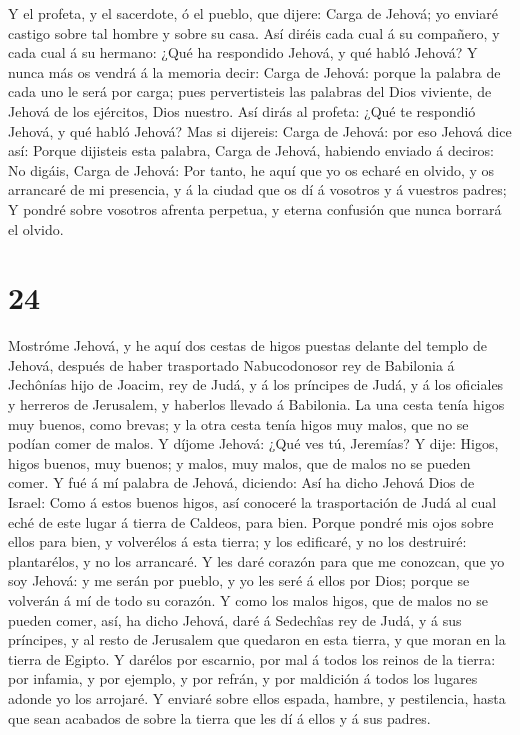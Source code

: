 Y el profeta, y el sacerdote, ó el pueblo, que dijere: Carga de Jehová;
yo enviaré castigo sobre tal hombre y sobre su casa.  Así
diréis cada cual á su compañero, y cada cual á su hermano: ¿Qué ha
respondido Jehová, y qué habló Jehová?  Y nunca más os
vendrá á la memoria decir: Carga de Jehová: porque la palabra de cada
uno le será por carga; pues pervertisteis las palabras del Dios
viviente, de Jehová de los ejércitos, Dios nuestro.  Así
dirás al profeta: ¿Qué te respondió Jehová, y qué habló Jehová?
 Mas si dijereis: Carga de Jehová: por eso Jehová dice así:
Porque dijisteis esta palabra, Carga de Jehová, habiendo enviado á
deciros: No digáis, Carga de Jehová:  Por tanto, he aquí
que yo os echaré en olvido, y os arrancaré de mi presencia, y á la
ciudad que os dí á vosotros y á vuestros padres;  Y pondré
sobre vosotros afrenta perpetua, y eterna confusión que nunca borrará el
olvido.

\hypertarget{section-23}{%
\section{24}\label{section-23}}

 Mostróme Jehová, y he aquí dos cestas de higos puestas
delante del templo de Jehová, después de haber trasportado Nabucodonosor
rey de Babilonia á Jechônías hijo de Joacim, rey de Judá, y á los
príncipes de Judá, y á los oficiales y herreros de Jerusalem, y haberlos
llevado á Babilonia.  La una cesta tenía higos muy buenos,
como brevas; y la otra cesta tenía higos muy malos, que no se podían
comer de malos.  Y díjome Jehová: ¿Qué ves tú, Jeremías? Y
dije: Higos, higos buenos, muy buenos; y malos, muy malos, que de malos
no se pueden comer.  Y fué á mí palabra de Jehová, diciendo:
 Así ha dicho Jehová Dios de Israel: Como á estos buenos
higos, así conoceré la trasportación de Judá al cual eché de este lugar
á tierra de Caldeos, para bien.  Porque pondré mis ojos
sobre ellos para bien, y volverélos á esta tierra; y los edificaré, y no
los destruiré: plantarélos, y no los arrancaré.  Y les daré
corazón para que me conozcan, que yo soy Jehová: y me serán por pueblo,
y yo les seré á ellos por Dios; porque se volverán á mí de todo su
corazón.  Y como los malos higos, que de malos no se pueden
comer, así, ha dicho Jehová, daré á Sedechîas rey de Judá, y á sus
príncipes, y al resto de Jerusalem que quedaron en esta tierra, y que
moran en la tierra de Egipto.  Y darélos por escarnio, por
mal á todos los reinos de la tierra: por infamia, y por ejemplo, y por
refrán, y por maldición á todos los lugares adonde yo los arrojaré.
 Y enviaré sobre ellos espada, hambre, y pestilencia, hasta
que sean acabados de sobre la tierra que les dí á ellos y á sus padres.


